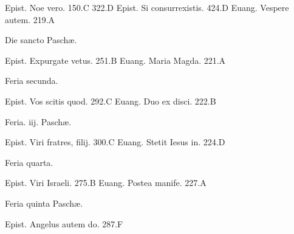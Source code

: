 \documentclass[a5paper,10pt]{book}
\def\ae{æ}
\begin{document}
\begin{multicols}{2}
\newline Epist. Noe vero. \hfill 150.C
 \hfill 322.D
\newline Epist. Si consurrexistis. \hfill 424.D
\newline Euang. Vespere autem. \hfill 219.A
\newline \vspace{-1.75em}
\begin{center}
\color{red} Die sancto Pasch\ae .
\end{center}
\vspace{-.75em}
\par \noindent Epist. Expurgate vetus. \hfill 251.B
\newline Euang. Maria Magda. \hfill 221.A
\newline \vspace{-1.75em}
\begin{center}
\color{red} Feria secunda.
\end{center}
\vspace{-.75em}
\par \noindent Epist. Vos scitis quod. \hfill 292.C
\newline Euang. Duo ex disci. \hfill 222.B
\newline \vspace{-1.75em}
\begin{center}
\color{red} Feria. iij. Pasch\ae .
\end{center}
\vspace{-.75em}
\par \noindent Epist. Viri fratres, filij. \hfill 300.C
\newline Euang. Stetit Iesus in. \hfill 224.D
\newline \vspace{-1.75em}
\begin{center}
\color{red} Feria quarta.
\end{center}
\vspace{-.75em}
\par \noindent Epist. Viri Israeli. \hfill 275.B
\newline Euang. Postea manife. \hfill 227.A
\newline \vspace{-1.75em}
\begin{center}
\color{red} Feria quinta Pasch\ae .
\end{center}
\vspace{-.75em}
\par \noindent Epist. Angelus autem do. \hfill 287.F

\end{multicols}
\end{document}
